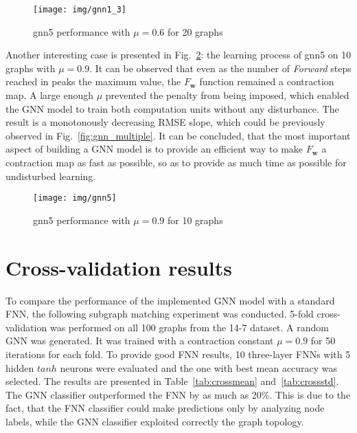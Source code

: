 \begin{figure}[h!]
\begin{center}
	\texttt{[image: img/gnn1\_3]}
	\caption{gnn5 performance with $\mu = 0.6$ for 20 graphs}
	\label{fig:gnn5_06}
\end{center}
\end{figure}

\newpage
Another interesting case is presented in Fig.~\ref{fig:gnn5_09_10}: the learning process of gnn5 on 10 graphs with $\mu = 0.9$. It can be observed that even as the number of \emph{Forward} steps reached in peaks the maximum value, the $F_{\bm{w}}$ function remained a contraction map. A large enough $\mu$ prevented the penalty from being imposed, which enabled the GNN model to train both computation units without any disturbance. The result is a monotonously decreasing RMSE slope, which could be previously observed in Fig.~\ref{fig:gnn_multiple}. It can be concluded, that the most important aspect of building a GNN model is to provide an efficient way to make $F_{\bm{w}}$ a contraction map as fast as possible, so as to provide as much time as possible for undisturbed learning.

\newpage
\begin{figure}[h!]
\begin{center}
	\texttt{[image: img/gnn5]}
	\caption{gnn5 performance with $\mu = 0.9$ for 10 graphs}
	\label{fig:gnn5_09_10}
\end{center}
\end{figure}

\newpage
\section{Cross-validation results}
To compare the performance of the implemented GNN model with a standard FNN, the following subgraph matching experiment was conducted. 5-fold cross-validation was performed on all 100 graphs from the 14-7 dataset. A random GNN was generated. It was trained with a contraction constant $\mu = 0.9$ for 50 iterations for each fold. To provide good FNN results, 10 three-layer FNNs with 5 hidden $tanh$ neurons were evaluated and the one with best mean accuracy was selected. The results are presented in Table~\ref{tab:crossmean} and~\ref{tab:crossstd}. The GNN classifier outperformed the FNN by as much as 20\%. This is due to the fact, that the FNN classifier could make predictions only by analyzing node labels, while the GNN classifier exploited correctly the graph topology.

